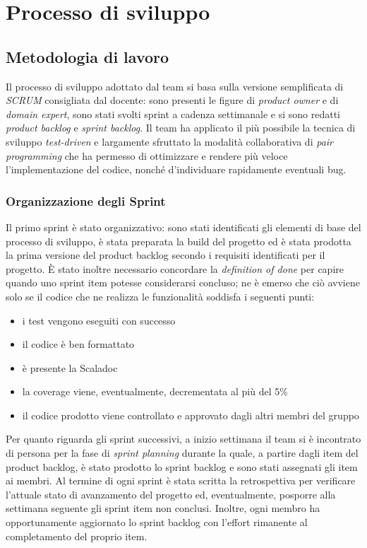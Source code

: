 \chapter{Processo di sviluppo}\label{ch:processo-di-sviluppo}
\section{Metodologia di lavoro}\label{sec:metodologia-di-lavoro}
Il processo di sviluppo adottato dal team si basa sulla versione semplificata di \textit{SCRUM} consigliata dal docente:
sono presenti le figure di \textit{product owner} e di \textit{domain expert}, sono stati svolti sprint a cadenza
settimanale e si sono redatti \textit{product backlog} e \textit{sprint backlog}.
Il team ha applicato il più possibile la tecnica di sviluppo \textit{test-driven} e largamente sfruttato la modalità
collaborativa di \textit{pair programming} che ha permesso di ottimizzare e rendere più veloce l'implementazione del
codice, nonché d'individuare rapidamente eventuali bug.

\subsection{Organizzazione degli Sprint}\label{subsec:organizzazione-sprint}
Il primo sprint è stato organizzativo: sono stati identificati gli elementi di base del processo di sviluppo, è stata
preparata la build del progetto ed è stata prodotta la prima versione del product backlog secondo i requisiti
identificati per il progetto.
È stato inoltre necessario concordare la \textit{definition of done} per capire quando uno sprint item potesse
considerarsi concluso;
ne è emerso che ciò avviene solo se il codice che ne realizza le funzionalità soddisfa i seguenti punti:
\begin{itemize}
    \item i test vengono eseguiti con successo
    \item il codice è ben formattato
    \item è presente la Scaladoc
    \item la coverage viene, eventualmente, decrementata al più del 5\%
    \item il codice prodotto viene controllato e approvato dagli altri membri del gruppo
\end{itemize}
Per quanto riguarda gli sprint successivi, a inizio settimana il team si è incontrato di persona per la fase di
\textit{sprint planning} durante la quale, a partire dagli item del product backlog, è stato prodotto lo
sprint backlog e sono stati assegnati gli item ai membri.
Al termine di ogni sprint è stata scritta la retrospettiva per verificare l'attuale stato di avanzamento del progetto
ed, eventualmente, posporre alla settimana seguente gli sprint item non conclusi.
Inoltre, ogni membro ha opportunamente aggiornato lo sprint backlog con l'effort rimanente al completamento del
proprio item.

